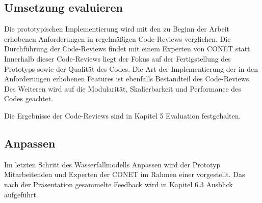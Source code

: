 \subsection{Umsetzung evaluieren}
Die prototypischen Implementierung wird mit den zu Beginn der Arbeit erhobenen Anforderungen in regelmäßigen Code-Reviews verglichen. Die Durchführung der Code-Reviews findet mit einem Experten von CONET statt. Innerhalb dieser Code-Reviews liegt der Fokus auf der Fertigstellung des Prototyps sowie der Qualität des Codes. Die Art der Implementierung der in den Anforderungen erhobenen Features ist ebenfalls Bestandteil des Code-Reviews. Des Weiteren wird auf die Modularität, Skalierbarkeit und Performance des Codes geachtet.

Die Ergebnisse der Code-Reviews sind in Kapitel 5 \glqq Evaluation\grqq{} festgehalten. 

\subsection{Anpassen}
Im letzten Schritt des Wasserfallmodells \glqq Anpassen\grqq{} wird der Prototyp Mitarbeitenden und Experten der CONET im Rahmen einer vorgestellt. Das nach der Präsentation gesammelte Feedback wird in Kapitel 6.3 \glqq Ausblick\grqq{} aufgeführt. 